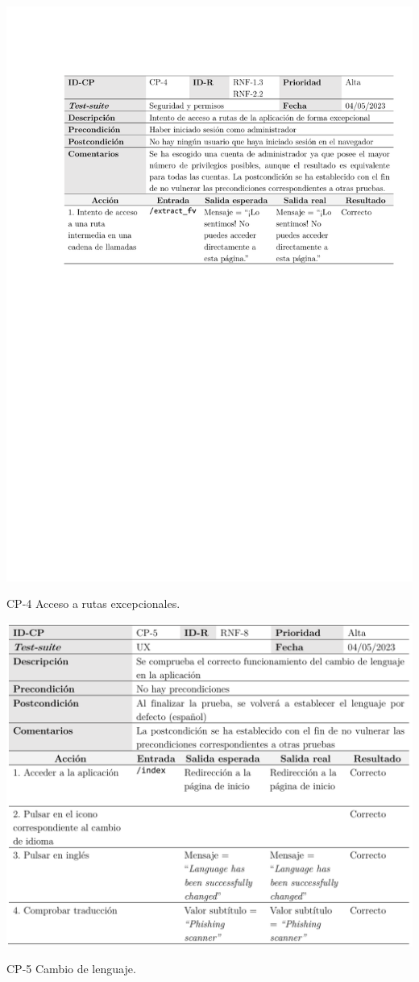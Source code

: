 \begin{table}[p]
	\centering
	\includegraphics[width=\textwidth]{../img/anexos/cp/CP-4}
	\caption{CP-4 Acceso a rutas excepcionales.}
	\label{cp:wrong-stream}
\end{table}

\begin{table}[p]
	\centering
	\includegraphics[width=\textwidth]{../img/anexos/cp/CP-5}
	\caption{CP-5 Cambio de lenguaje.}
	\label{cp:language}
\end{table}

